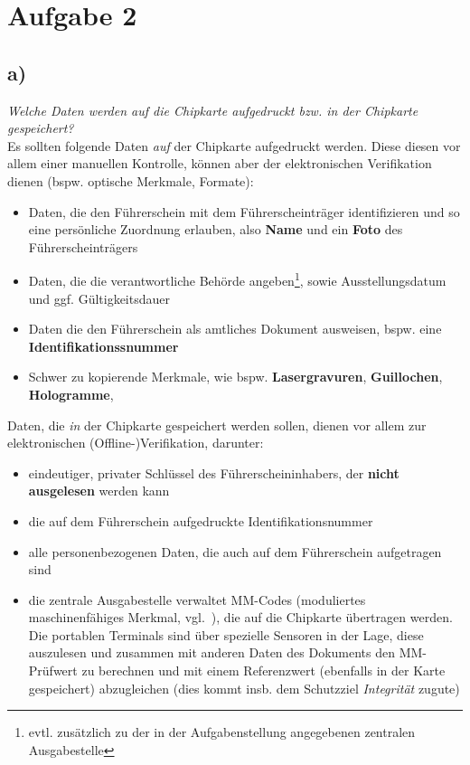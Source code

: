 \chapter{Aufgabe 2}

\section{a)}

\textit{Welche Daten werden auf die Chipkarte aufgedruckt bzw. in der Chipkarte
gespeichert?}\\

\noindent
Es sollten folgende Daten \textit{auf} der Chipkarte aufgedruckt werden.
Diese diesen vor allem einer manuellen Kontrolle, können aber der elektronischen Verifikation dienen (bspw. optische Merkmale, Formate):

\begin{itemize}
    \itemsep0.5em
    \item Daten, die den Führerschein mit dem Führerscheinträger identifizieren und so eine persönliche Zuordnung erlauben, also \textbf{Name} und ein \textbf{Foto} des Führerscheinträgers
    \item Daten, die die verantwortliche Behörde angeben\footnote{
        evtl. zusätzlich zu der in der Aufgabenstellung angegebenen zentralen Ausgabestelle
    }, sowie Ausstellungsdatum und ggf. Gültigkeitsdauer
    \item Daten die den Führerschein als amtliches Dokument ausweisen, bspw. eine \textbf{Identifikationssnummer}
    \item Schwer zu kopierende Merkmale, wie bspw. \textbf{Lasergravuren}, \textbf{Guillochen}, \textbf{Hologramme},
\end{itemize}

\noindent
Daten, die \textit{in} der Chipkarte gespeichert werden sollen, dienen vor allem zur elektronischen (Offline-)Verifikation, darunter:

\begin{itemize}
    \itemsep0.5em
    \item eindeutiger, privater Schlüssel des Führerscheininhabers, der \textbf{nicht ausgelesen} werden kann
    \item die auf dem Führerschein aufgedruckte Identifikationsnummer
    \item alle personenbezogenen Daten, die auch auf dem Führerschein aufgetragen sind
    \item die zentrale Ausgabestelle verwaltet MM-Codes (moduliertes maschinenfähiges Merkmal, vgl.~\cite[74]{ITS5}), die auf die Chipkarte übertragen werden.
    Die portablen Terminals sind über spezielle Sensoren in der Lage, diese auszulesen und zusammen mit anderen Daten des Dokuments den MM-Prüfwert zu berechnen und mit einem Referenzwert (ebenfalls in der Karte gespeichert) abzugleichen (dies kommt insb. dem Schutzziel \textit{Integrität} zugute)
\end{itemize}

